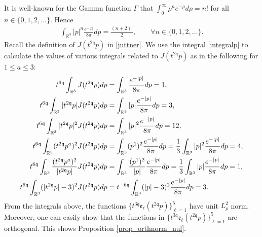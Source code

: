 \documentclass[reqno]{amsart}
\newcommand{\pv}{p}
\newcommand{\rth}{{\mathbb{R}^3}}
\newcommand{\qq}{\mathfrak{q}}
\newcommand{\tqq}{t^{2\qq}}
\newcommand{\tTq}{t^{3\qq}}
\newcommand{\tmQq}{t^{-6\qq}}
\newcommand{\tQQq}{t^{6\qq}}
\theoremstyle{definition}
\numberwithin{equation}{section}
\numberwithin{theorem}{section}
\begin{document}
It is well-known for the Gamma function \(\Gamma\) that \(\int_0^\infty \rho^n e^{-\rho} d\rho = n!\) for all \(n\in \{0,1,2,\ldots\}\). Hence
\begin{align}\label{integralp}
   \int_\rth | \pv |^n  \frac{e^{- |\pv|}}{8\pi} dp = \frac{(n+2)!}{2},\qquad \forall n\in \{0,1,2,\ldots\}. 
\end{align}
Recall the definition of \(J(\tqq \pv)\) in \eqref{juttner}. We use the integral \eqref{integralp} to calculate the values of various integrals related to $J(\tqq \pv)$ as in the following for $1 \leq a \leq 3$:
\begin{align} \notag
\tQQq\int_{\rth}J(\tqq p)dp &= \int_\rth   \frac{e^{- |\pv|}}{8\pi} dp =1,
\\\notag
\tQQq\int_\rth |\tqq \pv |J(\tqq p)dp
     &=\int_\rth | \pv |  \frac{e^{- |\pv|}}{8\pi} dp = 3, 
\\ \label{integralsVALUES}
\tQQq\int_\rth |\tqq \pv |^2J(\tqq p)dp
         &=  \int_\rth | \pv |^2  \frac{e^{- |\pv|}}{8\pi} dp = 12 , 
         \\ \notag
\tQQq\int_\rth (\tqq \pv^a)^2J(\tqq p)dp
              &=\int_\rth ( \pv^1)^2  \frac{e^{- |\pv|}}{8\pi} dp
              =
              \frac{1}{3} \int_\rth | \pv |^2  \frac{e^{- |\pv|}}{8\pi} dp = 4,
              \\ \notag
\tQQq\int_\rth \frac{(\tqq p^a)^2}{{|\tqq \pv |}}J(\tqq p)dp
                  &=\int_\rth \frac{( p^1)^2}{{| \pv |}}  \frac{e^{- |\pv|}}{8\pi} dp               =
              \frac{1}{3}\int_\rth | \pv |  \frac{e^{- |\pv|}}{8\pi} dp = 1,
                            \\ \notag
\tQQq\int_\rth (|\tqq \pv |-3)^2 J(\tqq p)dp
                  &=\tmQq\int_\rth (| \pv |-3)^2 \frac{e^{- |\pv|}}{8\pi}dp 
                = 3.
\end{align}
From the integrals above, the functions $\{\tTq \mathfrak{e}_{\ell}(\tqq \pv)\}_{\ell=1}^{5}$ have unit \(L^2_p\) norm. Moreover, one can easily show that the functions in $\{\tTq \mathfrak{e}_{\ell}(\tqq \pv)\}_{\ell=1}^{5}$ are orthogonal. This shows Proposition \ref{prop_orthnorm_nul}.
\end{document}
